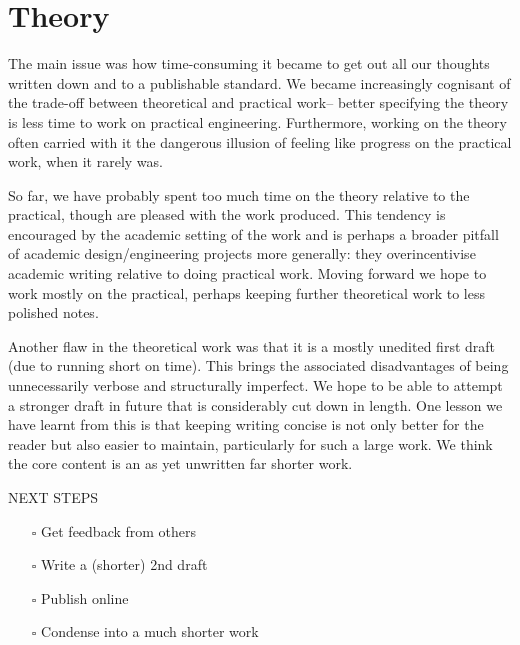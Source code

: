 \documentclass[logo,bsc,singlespacing,parskip]{infthesis}
\begin{document}
\section*{Theory}
\label{sec:org752c859}
The main issue was how time-consuming it became to get out all our thoughts written down and to a publishable standard.
We became increasingly cognisant of the trade-off between theoretical and practical work-- better specifying the theory is less time to work on practical engineering.
Furthermore, working on the theory often carried with it the dangerous illusion of feeling like progress on the practical work, when it rarely was.

So far, we have probably spent too much time on the theory relative to the practical, though are pleased with the work produced.
This tendency is encouraged by the academic setting of the work and is perhaps a broader pitfall of academic design/engineering projects more generally: they overincentivise academic writing relative to doing practical work.
Moving forward we hope to work mostly on the practical, perhaps keeping further theoretical work to less polished notes.

Another flaw in the theoretical work was that it is a mostly unedited first draft (due to running short on time).
This brings the associated disadvantages of being unnecessarily verbose and structurally imperfect.
We hope to be able to attempt a stronger draft in future that is considerably cut down in length.
One lesson we have learnt from this is that keeping writing concise is not only better for the reader but also easier to maintain, particularly for such a large work.
We think the core content is an as yet unwritten far shorter work.

\begin{mdframed}
\begin{description}
\item[{NEXT STEPS}] 
\end{description}


\begin{itemize}
\item[{$\square$}] Get feedback from others
\item[{$\square$}] Write a (shorter) 2nd draft
\item[{$\square$}] Publish online
\item[{$\square$}] Condense into a much shorter work
\end{itemize}
\end{mdframed}
\end{document}
